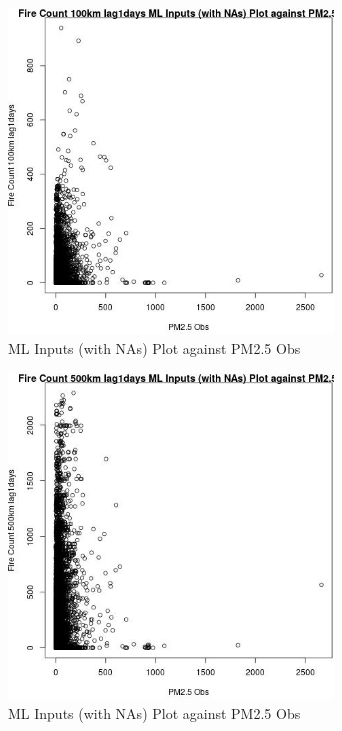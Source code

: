 \begin{figure} 
\centering  
\includegraphics[width=0.77\textwidth]{Code_Outputs/Report_ML_input_PM25_Step4_part_e_de_duplicated_aves_compiled_2019-05-21wNAs_Fire_Count_100km_lag1daysvPM25_Obs.jpg} 
\caption{\label{fig:Report_ML_input_PM25_Step4_part_e_de_duplicated_aves_compiled_2019-05-21wNAsFire_Count_100km_lag1daysvPM25_Obs}ML Inputs (with NAs) Plot against PM2.5 Obs} 
\end{figure} 
 

\begin{figure} 
\centering  
\includegraphics[width=0.77\textwidth]{Code_Outputs/Report_ML_input_PM25_Step4_part_e_de_duplicated_aves_compiled_2019-05-21wNAs_Fire_Count_500km_lag1daysvPM25_Obs.jpg} 
\caption{\label{fig:Report_ML_input_PM25_Step4_part_e_de_duplicated_aves_compiled_2019-05-21wNAsFire_Count_500km_lag1daysvPM25_Obs}ML Inputs (with NAs) Plot against PM2.5 Obs} 
\end{figure} 
 

